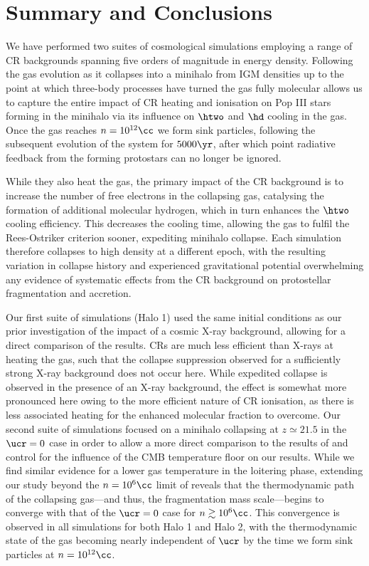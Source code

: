 \section{Summary and Conclusions}
\label{conclusions}

We have performed two suites of cosmological simulations employing a range of CR backgrounds spanning five orders of magnitude in energy density. 
Following the gas evolution as it collapses into a minihalo from IGM densities up to the point at which three-body processes have turned the gas fully molecular allows us to capture the entire impact of CR heating and ionisation on Pop III stars forming in the minihalo via its influence on $\htwo$ and $\hd$ cooling in the gas.
Once the gas reaches $n=10^{12}\cc$ we form sink particles, following the subsequent evolution of the system for $5000\yr$, after which point radiative feedback from the forming protostars can no longer be ignored.

While they also heat the gas, the primary impact of the CR background is to increase the number of free electrons in the collapsing gas, catalysing the formation of additional molecular hydrogen, which in turn enhances the $\htwo$ cooling efficiency.  
This decreases the cooling time, allowing the gas to fulfil the Rees-Ostriker criterion sooner, expediting minihalo collapse. 
Each simulation therefore collapses to high density at a different epoch, with the resulting variation in collapse history and experienced gravitational potential overwhelming any evidence of systematic effects from the CR background on protostellar fragmentation and accretion.

Our first suite of simulations (Halo 1) used the same initial conditions as our prior investigation of the impact of a cosmic X-ray background, allowing for a direct comparison of the results.
CRs are much less efficient than X-rays at heating the gas, such that the collapse suppression observed for a sufficiently strong X-ray background does not occur here.  
While expedited collapse is observed in the presence of an X-ray background, the effect is somewhat more pronounced here owing to the more efficient nature of CR ionisation, as there is less associated heating for the enhanced molecular fraction to overcome.
Our second suite of simulations focused on a minihalo collapsing at $z\simeq21.5$ in the $\ucr=0$ case in order to allow a more direct comparison to the results of \citet{StacyBromm2007} and control for the influence of the CMB temperature floor on our results.
While we find similar evidence for a lower gas temperature in the loitering phase, extending our study beyond the $n=10^6\cc$ limit of \citet{StacyBromm2007} reveals that the thermodynamic path of the collapsing gas---and thus, the fragmentation mass scale---begins to converge with that of the $\ucr=0$ case for $n\gtrsim10^6\cc$.  
This convergence is observed in all simulations for both Halo 1 and Halo 2, with the thermodynamic state of the gas becoming nearly independent of $\ucr$ by the time we form sink particles at $n=10^{12}\cc$.

